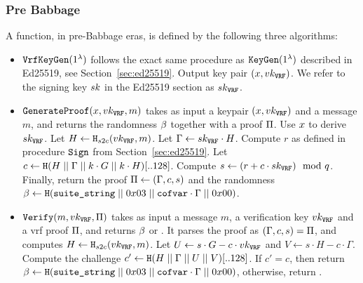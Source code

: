 \subsubsection{Pre Babbage}
A \vrf function, in pre-Babbage eras, is defined by the following three algorithms:
\begin{itemize}
\item $\texttt{VrfKeyGen}(1^\lambda)$ follows the exact same procedure as $\texttt{KeyGen}(1^\lambda)$ described in Ed25519, see Section~\ref{sec:ed25519}. Output key pair $(x, vk_{\texttt{VRF}})$. We refer to the signing key $sk$ in the Ed25519 section as $sk_{\texttt{VRF}}$.
\item $\texttt{GenerateProof}(x, vk_{\texttt{VRF}}, m)$ takes as input a keypair $(x, vk_{\texttt{VRF}})$ and a message $m$, and returns the \vrf randomness $\beta$ together with a proof $\Pi$. Use $x$ to derive $sk_{\texttt{VRF}}$. Let $H \gets \texttt{H}_{s2c}(vk_{\texttt{VRF}}, m)$. Let $\Gamma \gets sk_{\texttt{VRF}}\cdot H$. Compute $r$ as defined in procedure $\texttt{Sign}$ from Section~\ref{sec:ed25519}. Let $c \gets \texttt{H}(H\;||\;\Gamma\;||\; k\cdot G\;||\; k\cdot H)[..128]$. Compute $s \gets (r + c\cdot sk_{\texttt{VRF}})\mod{q}$. Finally, return the proof $\Pi \gets (\Gamma, c, s)$ and the randomness $\beta \gets \texttt{H}(\texttt{suite\_string}\;||\; 0x03\;||\;\texttt{cofvar}\cdot\Gamma\;||\; 0x00)$.
\item $\texttt{Verify}(m, vk_{\texttt{VRF}}, \Pi)$ takes as input a message $m$, a verification key $vk_{\texttt{VRF}}$ and a vrf proof $\Pi$, and returns $\beta$ or \false. It parses the proof as $(\Gamma, c, s) = \Pi$, and computes $H\gets\texttt{H}_{s2c}(vk_{\texttt{VRF}}, m)$. Let $U \gets s\cdot G - c\cdot vk_{\texttt{VRF}}$ and $V \gets s\cdot H - c\cdot\Gamma$. Compute the challenge $c'\gets\texttt{H}(H\;||\;\Gamma\;||\; U\;||\; V)[..128]$. If $c'=c$, then return $\beta \gets  \texttt{H}(\texttt{suite\_string}\;||\; 0x03\;||\;\texttt{cofvar}\cdot\Gamma\;||\; 0x00)$, otherwise, return \false.
\end{itemize}
